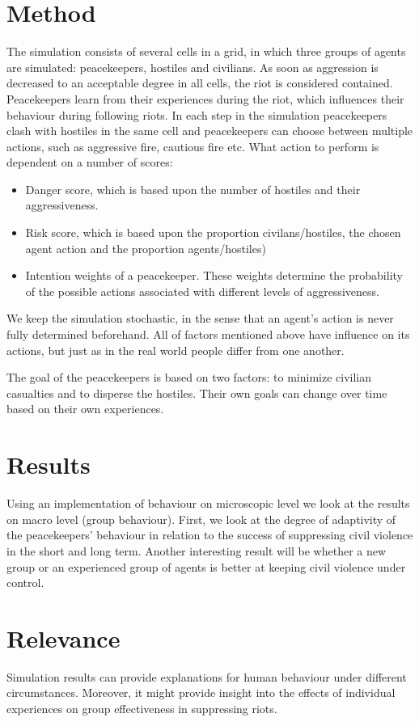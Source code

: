 \documentclass[11pt,a4paper]{article}
\begin{document}
	\section{Method}
		The simulation consists of several cells in a grid, in which three groups of agents are simulated: peacekeepers, hostiles and civilians. As soon as aggression is decreased to an acceptable degree in all cells, the riot is considered contained. Peacekeepers learn from their experiences during the riot, which influences their behaviour during following riots. In each step in the simulation peacekeepers clash with hostiles in the same cell and peacekeepers can choose between multiple actions, such as aggressive fire, cautious fire etc. What action to perform is dependent on a number of scores:
		
		\begin{itemize}
			\item Danger score, which is based upon the number of hostiles and their aggressiveness.
			\item Risk score, which is based upon the proportion civilans/hostiles, the chosen agent action and the proportion agents/hostiles)
			\item Intention weights of a peacekeeper. These weights determine the probability of the possible actions associated with different levels of aggressiveness.
		\end{itemize}
		
		We keep the simulation stochastic, in the sense that an agent's action is never fully determined beforehand. All of factors mentioned above have influence on its actions, but just as in the real world people differ from one another.
	
		The goal of the peacekeepers is based on two factors: to minimize civilian casualties and to disperse the hostiles. Their own goals can change over time based on their own experiences. 
		
	\section{Results}
		Using an implementation of behaviour on microscopic level we look at the results on macro level (group behaviour).
		First, we look at the degree of adaptivity of the peacekeepers' behaviour in relation to the success of suppressing civil violence in the short and long term. 
		Another interesting result will be whether a new group or an experienced group of agents is better at keeping civil violence under control.
		
	\section{Relevance}
		Simulation results can provide explanations for human behaviour under different circumstances. Moreover, it might provide insight into the effects of individual experiences on group effectiveness in suppressing riots.
		
	
	
\end{document}

